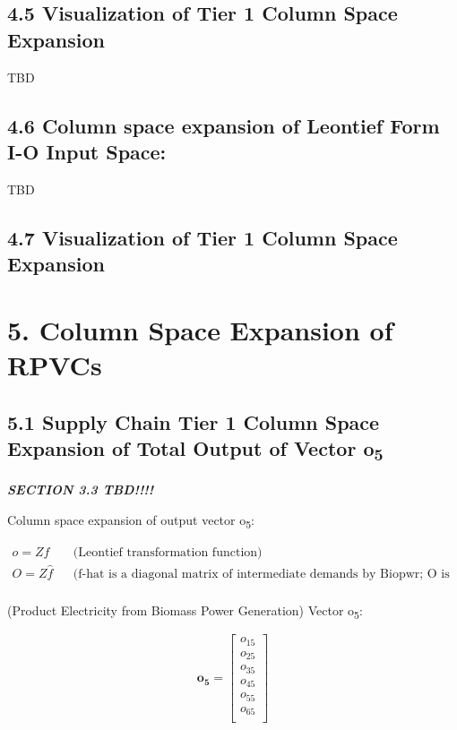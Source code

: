 \documentclass[
  letterpaper,
  DIV=11,
  numbers=noendperiod]{scrreprt}
\begin{document}
\subsection{4.5 Visualization of Tier 1 Column Space
Expansion}\label{visualization-of-tier-1-column-space-expansion}

TBD

\subsection{4.6 Column space expansion of Leontief Form I-O Input
Space:}\label{column-space-expansion-of-leontief-form-i-o-input-space}

TBD

\subsection{4.7 Visualization of Tier 1 Column Space
Expansion}\label{visualization-of-tier-1-column-space-expansion-1}

\section{5. Column Space Expansion of
RPVCs}\label{column-space-expansion-of-rpvcs}

\subsection{\texorpdfstring{5.1 Supply Chain Tier 1 Column Space
Expansion of Total Output of Vector
o\textsubscript{5}}{5.1 Supply Chain Tier 1 Column Space Expansion of Total Output of Vector o5}}\label{supply-chain-tier-1-column-space-expansion-of-total-output-of-vector-o5}

\textbf{\emph{SECTION 3.3 TBD!!!!}}

Column space expansion of output vector o\textsubscript{5}:

\[
\begin{align}
    o = Zf && \text{(Leontief transformation function)}\\
    O = Z\hat{f} && \text{(f-hat is a diagonal matrix of intermediate demands by Biopwr; O is the column space of o)}\\
\end{align}
\]

(Product Electricity from Biomass Power Generation) Vector
o\textsubscript{5}:

\[\mathbf{o_5} = \left[\begin{array}
{rrr}
o_{15} \\
o_{25} \\
o_{35} \\
o_{45} \\
o_{55} \\
o_{65} \\
\end{array}\right]
\]
\end{document}
